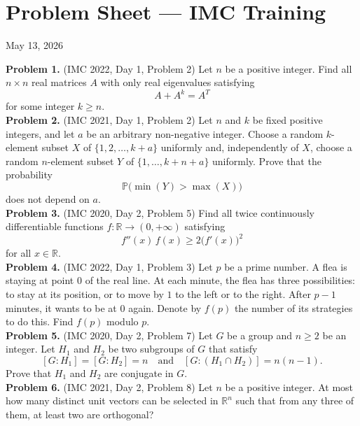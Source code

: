 \documentclass{article}
\newcommand{\R}{\mathbb{R}}
\begin{document}
\pagestyle{plain}

\section*{Problem Sheet --- IMC Training}

\begin{center}
May 13, 2026
\end{center}

\textbf{Problem 1.} (IMC 2022, Day 1, Problem 2)
Let \( n \) be a positive integer. Find all \( n \times n \) real matrices \( A \) with only real eigenvalues
satisfying
\[
A + A^k = A^T
\]
for some integer \( k \geq n \).
\\

\textbf{Problem 2.} (IMC 2021, Day 1, Problem 2)
Let \( n \) and \( k \) be fixed positive integers, and let \( a \) be an arbitrary non-negative integer.
Choose a random \( k \)-element subset \( X \) of \( \{1, 2, \ldots, k + a\} \) uniformly and, independently of \( X \),
choose a random \( n \)-element subset \( Y \) of \( \{1, \ldots, k + n + a\} \) uniformly.
Prove that the probability
\[
\mathbb{P}\bigl(\min(Y) > \max(X)\bigr)
\]
does not depend on \( a \).
\\

\textbf{Problem 3.} (IMC 2020, Day 2, Problem 5)
Find all twice continuously differentiable functions \( f : \R \to (0, +\infty) \) satisfying
\[
f''(x)\, f(x) \geq 2\bigl(f'(x)\bigr)^2
\]
for all \( x \in \R \).
\\

\textbf{Problem 4.} (IMC 2022, Day 1, Problem 3)
Let \( p \) be a prime number. A flea is staying at point \( 0 \) of the real line. At each minute,
the flea has three possibilities: to stay at its position, or to move by \( 1 \) to the left or to the right.
After \( p - 1 \) minutes, it wants to be at \( 0 \) again. Denote by \( f(p) \) the number of its strategies to do this.
Find \( f(p) \) modulo \( p \).
\\

\textbf{Problem 5.} (IMC 2020, Day 2, Problem 7)
Let \( G \) be a group and \( n \geq 2 \) be an integer. Let \( H_1 \) and \( H_2 \) be two subgroups of \( G \) that satisfy
\[
[G : H_1] = [G : H_2] = n \quad \text{and} \quad [G : (H_1 \cap H_2)] = n(n - 1).
\]
Prove that \( H_1 \) and \( H_2 \) are conjugate in \( G \).
\\

\textbf{Problem 6.} (IMC 2021, Day 2, Problem 8)
Let \( n \) be a positive integer. At most how many distinct unit vectors can be selected in \( \R^n \)
such that from any three of them, at least two are orthogonal?
\\
\end{document}
